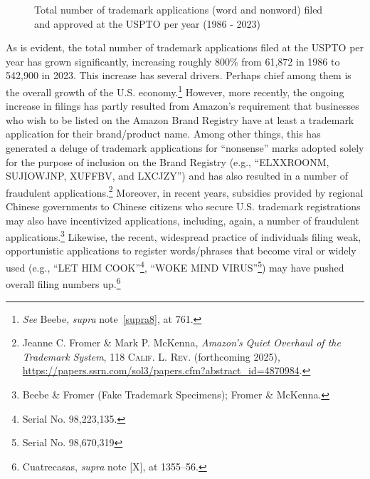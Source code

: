 \documentclass[letterpaper, 11pt, oneside]{article}
\begin{document}
\begin{figure}[H]
\centering

\caption{\label{fig:1} Total number of trademark applications (word and nonword) filed and approved at the USPTO per year (1986 - 2023)}
\end{figure}

As is evident, the total number of trademark applications filed at the USPTO per year has grown significantly, increasing roughly 800\% from 61,872 in 1986 to 542,900 in 2023. This increase has several drivers. Perhaps chief among them is the overall growth of the U.S. economy.\footnote{\textit{See} Beebe, \textit{supra} note~\ref{supra8}, at 761.} However, more recently, the ongoing increase in filings has partly resulted from Amazon's requirement that businesses who wish to be listed on the Amazon Brand Registry have at least a trademark application for their brand/product name. Among other things, this has generated a deluge of trademark applications for ``nonsense'' marks adopted solely for the purpose of inclusion on the Brand Registry (e.g., ``ELXXROONM, SUJIOWJNP, XUFFBV, and LXCJZY'') and has also resulted in a number of fraudulent applications.\footnote{Jeanne C. Fromer \& Mark P. McKenna, \textit{Amazon's Quiet Overhaul of the Trademark System}, 118 \textsc{Calif. L. Rev.} (forthcoming 2025), \url{https://papers.ssrn.com/sol3/papers.cfm?abstract_id=4870984}.} Moreover, in recent years, subsidies provided by regional Chinese governments to Chinese citizens who secure U.S. trademark registrations may also have incentivized applications, including, again, a number of fraudulent applications.\footnote{Beebe \& Fromer (Fake Trademark Specimens); Fromer \& McKenna.} Likewise, the recent, widespread practice of individuals filing weak, opportunistic applications to register words/phrases that become viral or widely used (e.g., ``LET HIM COOK''\footnote{Serial No. 98,223,135.}, ``WOKE MIND VIRUS''\footnote{Serial No. 98,670,319}) may have pushed overall filing numbers up.\footnote{Cuatrecasas, \textit{supra} note [X], at 1355–56.}
\end{document}
